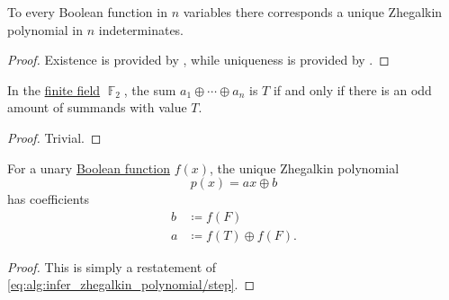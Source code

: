 \begin{proposition}\label{thm:zhegalkin_polynomial_uniqueness}
  To every Boolean function in \( n \) variables there corresponds a unique Zhegalkin polynomial in \( n \) indeterminates.
\end{proposition}
\begin{proof}
  Existence is provided by , while uniqueness is provided by .
\end{proof}

\begin{lemma}\label{thm:f2_sum_parity}
  In the \hyperref[def:finite_field]{finite field} \( \BbbF_2 \), the sum \( a_1 \oplus \cdots \oplus a_n \) is \( T \) if and only if there is an odd amount of summands with value \( T \).
\end{lemma}
\begin{proof}
  Trivial.
\end{proof}

\begin{proposition}\label{thm:unary_boolean_function_zhegalkin_polynomial}
  For a unary \hyperref[def:boolean_function]{Boolean function} \( f(x) \), the unique Zhegalkin polynomial
  \begin{equation}\label{eq:thm:unary_boolean_function_zhegalkin_polynomial}
    p(x) = ax \oplus b
  \end{equation}
  has coefficients
  \begin{align*}
    b &\coloneqq f(F) \\
    a &\coloneqq f(T) \oplus f(F).
  \end{align*}
\end{proposition}
\begin{proof}
  This is simply a restatement of \eqref{eq:alg:infer_zhegalkin_polynomial/step}.
\end{proof}

